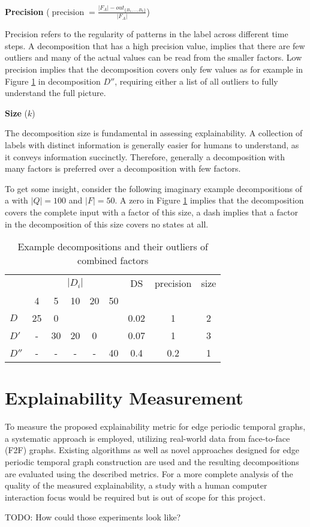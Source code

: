 \textbf{Precision} ($\operatorname{precision} = \frac{|F_A| - out_{\{B_1,\dots,B_k\}}}{|F_A|}$)

Precision refers to the regularity of patterns in the label across different time steps.
A decomposition that has a high precision value, implies that there are few outliers and many of the actual values can be read from the smaller factors.
Low precision implies that the decomposition covers only few values as for example in Figure \ref{tab:metric-example-decompositions} in decomposition $D''$, requiring either a list of all outliers to fully understand the full picture.

\textbf{Size} ($k$)

The decomposition size is fundamental in assessing explainability.
A collection of labels with distinct information is generally easier for humans to understand, as it conveys information succinctly.
Therefore, generally a decomposition with many factors is preferred over a decomposition with few factors.

To get some insight, consider the following imaginary example decompositions of a \DFA with $|Q| = 100$ and $|F| = 50$.
A zero in Figure \ref{tab:metric-example-decompositions} implies that the decomposition covers the complete input \DFA with a factor of this size, a dash implies that a factor in the decomposition of this size covers no states at all.
\begin{table}[h]
	\centering
	\begin{tabular}{l|ccccc|ccc}
		& \multicolumn{5}{c}{$|D_i|$} & DS & precision & size \\
		& 4 & 5 & 10 & 20 & 50 & & & \\
		\hline
		$D$ & 25 & 0 & &  & & 0.02 & 1 & 2\\		
		$D'$ & - & 30 & 20 & 0 & & 0.07 & 1 & 3\\
		$D''$ & - & - & - & - & 40 & 0.4 & 0.2 & 1\\
	\end{tabular}
	\caption{Example decompositions and their outliers of combined factors}
	\label{tab:metric-example-decompositions}
\end{table}


\section{Explainability Measurement}

To measure the proposed explainability metric for edge periodic temporal graphs, a systematic approach is employed, utilizing real-world data from face-to-face (F2F) graphs.
Existing algorithms as well as novel approaches designed for edge periodic temporal graph construction are used and the resulting decompositions are evaluated using the described metrics.
For a more complete analysis of the quality of the measured explainability, a study with a human computer interaction focus would be required but is out of scope for this project.

TODO: How could those experiments look like?

